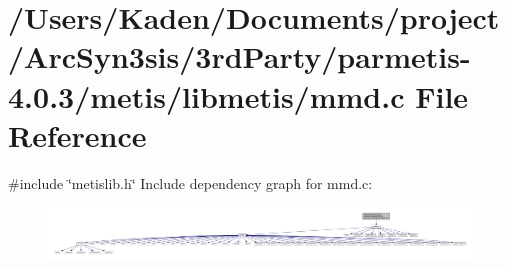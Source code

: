 \hypertarget{a00248}{}\section{/\+Users/\+Kaden/\+Documents/project/\+Arc\+Syn3sis/3rd\+Party/parmetis-\/4.0.3/metis/libmetis/mmd.c File Reference}
\label{a00248}
{\ttfamily \#include \char`\"{}metislib.\+h\char`\"{}}\newline
Include dependency graph for mmd.\+c\+:\nopagebreak
\begin{figure}[H]
\begin{center}
\leavevmode
\includegraphics[width=350pt]{a00249}
\end{center}
\end{figure}
